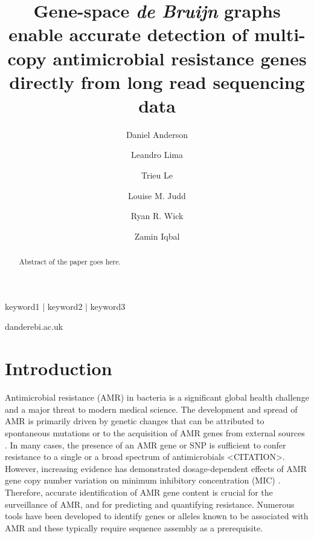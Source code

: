 
\title{Gene-space \textit{de Bruijn} graphs enable accurate detection of multi-copy antimicrobial resistance genes directly from long read sequencing data}
\shorttitle{}

\author[1, \Letter]{Daniel Anderson }
\author[1]{Leandro Lima }
\author[2]{Trieu Le \orcidlink {}}
\author[3]{Louise M. Judd }
\author[3]{Ryan R. Wick }
\author[1,2]{Zamin Iqbal }

\date{}

\maketitle

\begin{abstract}
Abstract of the paper goes here.
\end{abstract}

\begin{keywords}
keyword1 | keyword2 | keyword3
\end{keywords}

\begin{corrauthor}
dander\at ebi.ac.uk
\end{corrauthor}

\section*{Introduction}

Antimicrobial resistance (AMR) in bacteria is a significant global health challenge and a major threat to modern medical science. The development and spread of AMR is primarily driven by genetic changes that can be attributed to spontaneous mutations or to the acquisition of AMR genes from external sources \cite{10.1038/s41576-019-0108-4}. In many cases, the presence of an AMR gene or SNP is sufficient to confer resistance to a single or a broad spectrum of antimicrobials <CITATION>. However, increasing evidence has demonstrated dosage-dependent effects of AMR gene copy number variation on minimum inhibitory concentration (MIC) \cite{10.1128/aac.02026-19, 10.1128/AAC.46.10.3334-3336.2002}. Therefore, accurate identification of AMR gene content is crucial for the surveillance of AMR, and for predicting and quantifying resistance. Numerous tools have been developed to identify genes or alleles known to be associated with AMR \cite{Feldgarden2021, Florensa2022, 10.1093.nar.gkz935, Seemann2023, Hunt2017, Bradley2015} and these typically require sequence assembly as a prerequisite. 

